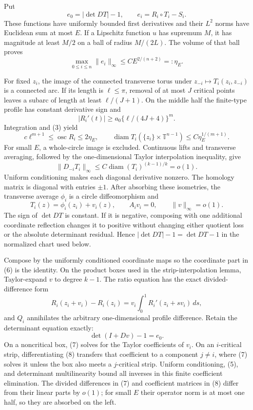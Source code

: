 Put
\[
 e_0=|\det DT|-1,\qquad e_i=R_i\circ T_i-S_i.
\tag{2}
\]
These functions have uniformly bounded first derivatives and their \(L^2\) norms have Euclidean sum at most \(E\).  If a Lipschitz function \(u\) has supremum \(M\), it has magnitude at least \(M/2\) on a ball of radius \(M/(2L)\).  The volume of that ball proves
\[
 \max_{0\leq i\leq n}\lVert e_i\rVert_\infty
 \leq C E^{2/(n+2)}=:\eta_E.
\tag{3}
\]

For fixed \(z_i\), the image of the connected transverse torus under \(z_{-i}\mapsto T_i(z_i,z_{-i})\) is a connected arc.  If its length is \(\ell\leq\pi\), removal of at most \(J\) critical points leaves a subarc of length at least \(\ell/(J+1)\).  On the middle half the finite-type profile has constant derivative sign and
\[
 |R_i'(t)|\geq a_0\{\ell/(4J+4)\}^m.
\]
Integration and (3) yield
\[
 c\ell^{m+1}\leq\operatorname {osc}R_i\leq2\eta_E,
\qquad
 \operatorname {diam}T_i(\{z_i\}\times\mathbb T^{n-1})
 \leq C\eta_E^{1/(m+1)}.
\tag{4}
\]
For small \(E\), a whole-circle image is excluded.  Continuous lifts and transverse averaging, followed by the one-dimensional Taylor interpolation inequality, give
\[
 \lVert D_{-i}T_i\rVert_\infty
 \leq C\operatorname {diam}(T_i)^{(k-1)/k}=o(1).
\tag{5}
\]
Uniform conditioning makes each diagonal derivative nonzero.  The homology matrix is diagonal with entries \(\pm1\).  After absorbing these isometries, the transverse average \(\phi_i\) is a circle diffeomorphism and
\[
 T_i(z)=\phi_i(z_i)+v_i(z),\qquad A_iv_i=0,\qquad\lVert v\rVert_\infty=o(1).
\tag{6}
\]
The sign of \(\det DT\) is constant.  If it is negative, composing with one additional coordinate reflection changes it to positive without changing either quotient loss or the absolute determinant residual.  Hence \(|\det DT|-1=\det DT-1\) in the normalized chart used below.

Compose by the uniformly conditioned coordinate maps so the coordinate part in (6) is the identity.  On the product boxes used in the strip-interpolation lemma, Taylor-expand \(v\) to degree \(k-1\).  The ratio equation has the exact divided-difference form
\[
 R_i(z_i+v_i)-R_i(z_i)
 =v_i\int_0^1R_i'(z_i+s v_i)\,ds,
\tag{7}
\]
and \(Q_i\) annihilates the arbitrary one-dimensional profile difference.  Retain the determinant equation exactly:
\[
 \det(I+Dv)-1=e_0.
\tag{8}
\]
On a noncritical box, (7) solves for the Taylor coefficients of \(v_i\).  On an \(i\)-critical strip, differentiating (8) transfers that coefficient to a component \(j\neq i\), where (7) solves it unless the box also meets a \(j\)-critical strip.  Uniform conditioning, (5), and determinant multilinearity bound all inverses in this finite coefficient elimination.  The divided differences in (7) and coefficient matrices in (8) differ from their linear parts by \(o(1)\); for small \(E\) their operator norm is at most one half, so they are absorbed on the left.

